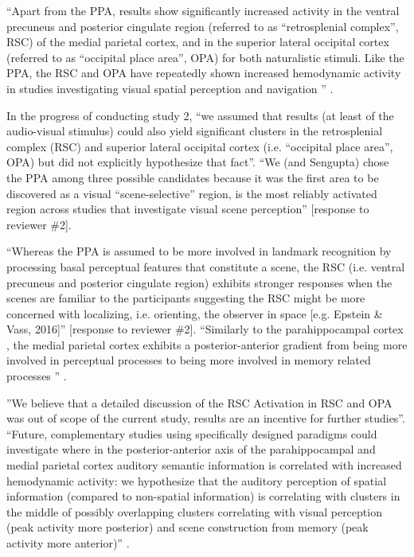 

%
``Apart from the PPA, results show significantly increased activity in the
ventral precuneus and posterior cingulate region (referred to as ``retrosplenial
complex'', RSC) of the medial parietal cortex, and in the superior lateral
occipital cortex (referred to as ``occipital place area'', OPA) for both
naturalistic stimuli.
Like the PPA, the RSC and OPA have repeatedly shown increased hemodynamic
activity in studies investigating visual spatial perception and navigation
\citep{chrastil2018heterogeneity, bettencourt2013role, dilks2013occipital,
epstein2019scene}'' \citep{haeusler2022processing}.

%
In the progress of conducting study 2, ``we assumed that results (at least of
the audio-visual stimulus) could also yield significant clusters in the
retrosplenial complex (RSC) and superior lateral occipital cortex (i.e.
“occipital place area”, OPA) but did not explicitly hypothesize that fact''.
%
``We (and Sengupta) chose the PPA among three possible candidates
because it was the first area to be discovered as a visual ``scene-selective''
region, is the most reliably activated region across studies that investigate
visual scene perception'' [response to reviewer \#2].

%
``Whereas the PPA is assumed to be more involved in landmark recognition by
processing basal perceptual features that constitute a scene, the RSC (i.e.
ventral precuneus and posterior cingulate region) exhibits stronger responses
when the scenes are familiar to the participants suggesting the RSC might be
more concerned with localizing, i.e. orienting, the observer in space [e.g.
Epstein \& Vass, 2016]'' [response to reviewer \#2].
``Similarly to the parahippocampal cortex \citep{aminoff2013role}, the medial
parietal cortex exhibits a posterior-anterior gradient from being more involved
in perceptual processes to being more involved in memory related processes
\citep{chrastil2018heterogeneity, hassabis2009construction, silson2019posterior,
steel2021network}'' \citep{haeusler2022processing}.

%
''We believe that a detailed discussion of the RSC Activation in RSC and OPA was
out of scope of the current study, results are an incentive for further
studies''.
``Future, complementary studies using specifically designed paradigms could
investigate where in the posterior-anterior axis of the parahippocampal and
medial parietal cortex auditory semantic information is correlated with
increased hemodynamic activity:
we hypothesize that the auditory perception of spatial information (compared to
non-spatial information) is correlating with clusters in the middle of possibly
overlapping clusters correlating with visual perception (peak activity more
posterior) and scene construction from memory (peak activity more anterior)''
\citep{haeusler2022processing}.

